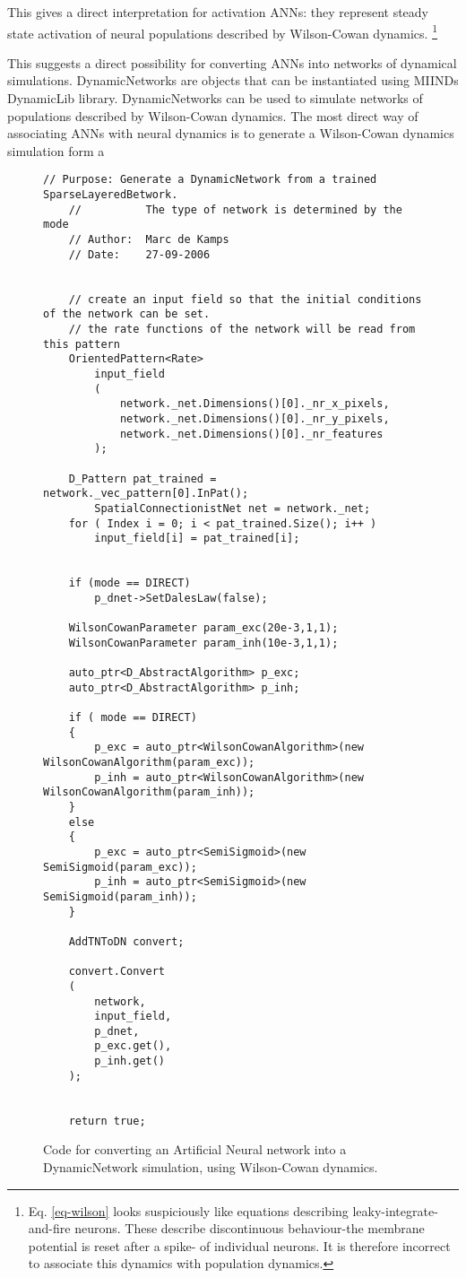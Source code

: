 \documentclass[11pt]{article}
\begin{document}
This gives a direct interpretation for activation ANNs: they represent steady state activation of neural populations described by Wilson-Cowan dynamics. \footnote{Eq. \ref{eq-wilson} looks suspiciously like equations describing leaky-integrate-and-fire neurons. These describe discontinuous behaviour-the membrane potential is reset after a spike- of individual neurons. It is therefore incorrect to associate this dynamics with population dynamics.}

This suggests a direct possibility for converting ANNs into networks of dynamical simulations. DynamicNetworks are objects that can be instantiated using MIINDs DynamicLib library. DynamicNetworks can be used to simulate networks of populations described by Wilson-Cowan dynamics. The most direct way of associating ANNs with neural dynamics is to generate a Wilson-Cowan dynamics simulation form a  
\begin{figure}[ht]
\begin{lstlisting}[frame=single]
	// Purpose: Generate a DynamicNetwork from a trained SparseLayeredBetwork.
	//			The type of network is determined by the mode
	// Author:  Marc de Kamps
	// Date:    27-09-2006


	// create an input field so that the initial conditions of the network can be set.
	// the rate functions of the network will be read from this pattern
	OrientedPattern<Rate> 
		input_field
		(
			network._net.Dimensions()[0]._nr_x_pixels,
			network._net.Dimensions()[0]._nr_y_pixels,
			network._net.Dimensions()[0]._nr_features
		);

	D_Pattern pat_trained = network._vec_pattern[0].InPat();
    	SpatialConnectionistNet net = network._net;
	for ( Index i = 0; i < pat_trained.Size(); i++ )
		input_field[i] = pat_trained[i];


	if (mode == DIRECT)
		p_dnet->SetDalesLaw(false);

	WilsonCowanParameter param_exc(20e-3,1,1);
	WilsonCowanParameter param_inh(10e-3,1,1);

	auto_ptr<D_AbstractAlgorithm> p_exc;
	auto_ptr<D_AbstractAlgorithm> p_inh;
	
	if ( mode == DIRECT)
	{
		p_exc = auto_ptr<WilsonCowanAlgorithm>(new WilsonCowanAlgorithm(param_exc));
		p_inh = auto_ptr<WilsonCowanAlgorithm>(new WilsonCowanAlgorithm(param_inh));
	}
	else
	{
		p_exc = auto_ptr<SemiSigmoid>(new SemiSigmoid(param_exc));
		p_inh = auto_ptr<SemiSigmoid>(new SemiSigmoid(param_inh));
	}

	AddTNToDN convert;

	convert.Convert
	(
		network,
		input_field,
		p_dnet,
		p_exc.get(),
		p_inh.get()
	);


	return true;
\end{lstlisting}
\caption{Code for converting an Artificial Neural network into a DynamicNetwork simulation, using Wilson-Cowan dynamics.}
\label{fig-smallpositive}
\end{figure}
\end{document}
